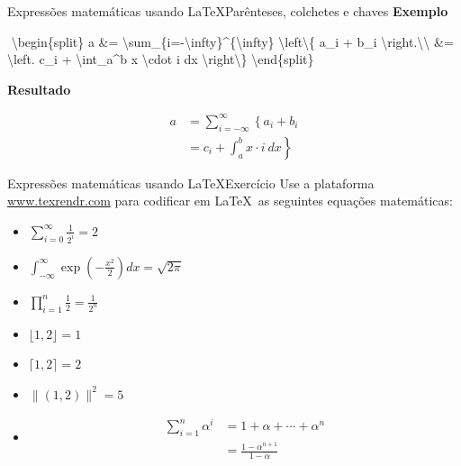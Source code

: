 \documentclass[
  10pt,
  ignorenonframetext,
]{beamer}
\newenvironment{Shaded}{\begin{snugshade}}{\end{snugshade}}
\newcommand{\ExtensionTok}[1]{\textcolor[rgb]{0.00,0.23,0.31}{#1}}
\newcommand{\KeywordTok}[1]{\textcolor[rgb]{0.00,0.23,0.31}{#1}}
\newcommand{\NormalTok}[1]{\textcolor[rgb]{0.00,0.23,0.31}{#1}}
\newcommand{\SpecialCharTok}[1]{\textcolor[rgb]{0.37,0.37,0.37}{#1}}
\newcommand{\SpecialStringTok}[1]{\textcolor[rgb]{0.13,0.47,0.30}{#1}}
\providecommand{\tightlist}{%
  \setlength{\itemsep}{0pt}\setlength{\parskip}{0pt}}\usepackage{longtable,booktabs,array}
\begin{document}
\begin{frame}[fragile]{Expressões matemáticas usando
\LaTeX\newline Parênteses, colchetes e chaves}
\protect\hypertarget{expressuxf5es-matemuxe1ticas-usando-paruxeanteses-colchetes-e-chaves-1}{}
\textbf{Exemplo}

\begin{Shaded}
\begin{Highlighting}[]
\SpecialStringTok{$$}
\KeywordTok{\textbackslash{}begin}\NormalTok{\{}\ExtensionTok{split}\NormalTok{\}}
\SpecialStringTok{a \&= }\SpecialCharTok{\textbackslash{}sum}\SpecialStringTok{\_\{i={-}}\SpecialCharTok{\textbackslash{}infty}\SpecialStringTok{\}\^{}\{}\SpecialCharTok{\textbackslash{}infty}\SpecialStringTok{\} }\SpecialCharTok{\textbackslash{}left\textbackslash{}\{}\SpecialStringTok{ a\_i + b\_i }\SpecialCharTok{\textbackslash{}right}\SpecialStringTok{.}\SpecialCharTok{\textbackslash{}\textbackslash{}}
\SpecialStringTok{\&= }\SpecialCharTok{\textbackslash{}left}\SpecialStringTok{. c\_i + }\SpecialCharTok{\textbackslash{}int}\SpecialStringTok{\_a\^{}b x }\SpecialCharTok{\textbackslash{}cdot}\SpecialStringTok{ i dx }\SpecialCharTok{\textbackslash{}right\textbackslash{}\}}
\KeywordTok{\textbackslash{}end}\NormalTok{\{}\ExtensionTok{split}\NormalTok{\}}
\SpecialStringTok{$$}
\end{Highlighting}
\end{Shaded}

\textbf{Resultado}

\[
\begin{split}
a &=  \sum_{i=-\infty}^{\infty} \left\{ a_i + b_i \right.\\
&= \left. c_i + \int_a^b x \cdot i\ dx \right\}
\end{split}
\]
\end{frame}

\begin{frame}{Expressões matemáticas usando \LaTeX\newline Exercício}
\protect\hypertarget{expressuxf5es-matemuxe1ticas-usando-exercuxedcio}{}
Use a plataforma \href{http://www.texrendr.com/}{www.texrendr.com} para
codificar em \LaTeX~as seguintes equações matemáticas:

\begin{itemize}
\tightlist
\item
  \(\sum_{i=0}^\infty \frac{1}{2^i} = 2\)
\item
  \(\int_{-\infty}^\infty \exp\left( -\frac{x^2}{2} \right)dx = \sqrt{2\pi}\)
\item
  \(\prod_{i=1}^n \frac{1}{2} = \frac{1}{2^n}\)
\item
  \(\lfloor 1,2 \rfloor = 1\)
\item
  \(\lceil 1,2 \rceil = 2\)
\item
  \(\|(1, 2)\|^2 = 5\)
\item
  \[\begin{split}\sum_{i=1}^{n} \alpha^i &= 1 + \alpha + \cdots + \alpha^n \\ &= \frac{1-\alpha^{n+1}}{1-\alpha} \end{split}\]
\end{itemize}
\end{frame}
\end{document}
